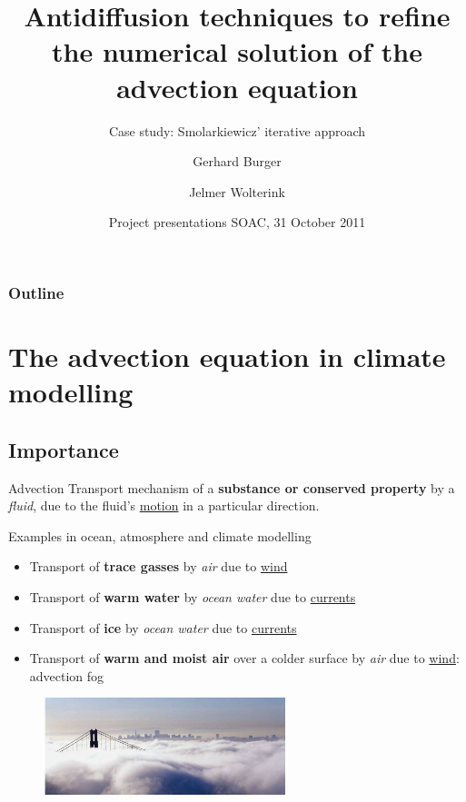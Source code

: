 \documentclass[hyperref={pdfstartview=Fit,pdfpagemode=FullScreen}]{beamer}
\title[Advection equation and antidiffusion]%
{Antidiffusion techniques to refine the numerical solution of the advection equation}
\subtitle{Case study: Smolarkiewicz' iterative approach}
\author[Gerhard Burger \and Jelmer Wolterink]%
{Gerhard Burger \and Jelmer Wolterink}
\institute[Utrecht University]%
{
  Scientific Computing\\
  Department of Mathematics\\
  Utrecht University
}
\date[31-Oct-2011] %
{Project presentations SOAC, 31 October 2011}
\begin{document}
\begin{frame}
  \titlepage
\end{frame}

\begin{frame}
\frametitle{Outline}
  \tableofcontents
\end{frame}

\section{The advection equation in climate modelling}
\subsection{Importance}

\begin{frame}

\begin{block}{Advection}
Transport mechanism of a \textbf{substance or conserved property} by a \textit{fluid}, due to the fluid's \underline{motion} in a particular direction.
\end{block}

Examples in ocean, atmosphere and climate modelling

\begin{itemize}
   \item Transport of \textbf{trace gasses} by \textit{air} due to \underline{wind}
   \item Transport of \textbf{warm water} by \textit{ocean water} due to \underline{currents}
   \item Transport of \textbf{ice} by \textit{ocean water} due to \underline{currents}
   \item Transport of \textbf{warm and moist air} over a colder surface by \textit{air} due to \underline{wind}: advection fog
\end{itemize}

\begin{figure}
\includegraphics[width=7cm]{advfog.png}
\end{figure}

\end{frame}
\end{document}
